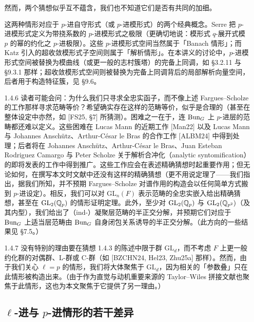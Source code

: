 然而，两个猜想似乎互不蕴含，我们也不知道它们是否有共同的加细。

这两种情形对应于 $p$-进自守形式（或 $p$-进模形式）的两个经典概念。Serre 把 $p$-进模形式定义为带挠系数的 $p$-进模形式之极限（更确切地说：模形式 $q$-展开式模 $p$ 的幂的约化之 $p$-进极限）。这些 $p$-进模形式空间当然属于「Banach 情形」；而 Katz 引入的超收敛模形式子空间则属于「解析情形」。在本讲义的讨论中，$p$-进模形式空间被替换为模曲线（或更一般的志村簇塔）的完备上同调，如 §3.2.11 与 §9.3.1 那样；超收敛模形式空间则被替换为完备上同调背后的局部解析向量空间，后者用于构造特征簇，见 §9.6。

\begin{rem}{1.4.6}\label{rem:a4-1-4-6}
读者可能会问：为什么我们只寻求全忠实函子，而不像上述 Fargues--Scholze 的工作那样寻求范畴等价？希望确实存在这样的范畴等价，似乎是合理的（甚至在整体设定中亦然，如 [FS25, §7] 所猜测）。困难之一在于，连 $\operatorname{Bun}_G$ 上 $p$-进层的范畴都还难以定义。这些困难在 Lucas Mann 的近期工作 [Man22] 以及 Lucas Mann 与 Johannes Anschütz、Arthur-César le Bras 的合作工作 [ALBM24] 中得到处理；后者将在 Johannes Anschütz、Arthur-César le Bras、Juan Esteban Rodriguez Camargo 与 Peter Scholze 关于解析合冲化（analytic syntomification）的即将发表的工作中得到推广。这些工作应会在表述精确猜想时起重要作用；但无论如何，在撰写本文时文献中还没有这样的精确猜想（更不用说定理了——我们指出，据我们所知，并不预期 Fargues--Scholze 对谱作用的构造会以任何简单方式搬到 $p$-进设定）。相反，我们可以对 $\mathrm{GL}_n(F)$ 表示范畴的全忠实嵌入给出精确猜想，甚至在 $\mathrm{GL}_2(\mathbb{Q}_p)$ 的情形证明定理。此外，至少对 $\mathrm{GL}_2(\mathbb{Q}_p)$ 与 $\mathrm{GL}_2(\mathbb{Q}_{p^2})$（及其内型），我们给出了（ind-）凝聚层范畴的半正交分解，并预期它们对应于 $\operatorname{Bun}_G$ 上适当层范畴由 $\operatorname{Bun}_G$ 自身闭包关系诱导的半正交分解。（此方向的一些结果见 §7.5。）
\end{rem}

\begin{rem}{1.4.7}\label{rem:a4-1-4-7}
没有特别的理由要在猜想 1.4.3 的陈述中限于群 $\mathrm{GL}_d$，而不考虑 $F$ 上更一般约化群的对偶群、L-群或 C-群（如 [BZCHN24, Hel23, Zhu25a] 那样）。然而，由于我们关心 $\ell=p$ 的情形，我们将大体聚焦于 $\mathrm{GL}_d$，因为相关的「参数叠」只在此情形被构造出来。（由于作为直觉与动机重要来源的 Taylor--Wiles 拼接文献也聚焦于此情形，这也为本文聚焦于它提供了另一理由。）
\end{rem}

\subsection{$\ell$-进与 $p$-进情形的若干差异}

